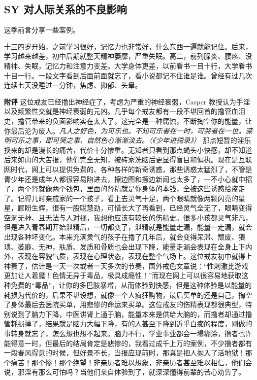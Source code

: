 \subsection{SY 对人际关系的不良影响}

这季前言分享一些案例。

\begin{case}
    十三四岁开始，之前学习很好，记忆力也非常好，什么东西一遍就能记住。后来，学习越来越差，初中后期就整天精神萎靡，严重失眠。高二，前列腺炎、腰疼、没精神、失眠，记忆力和注意力变差。大学身体更差，以前看书一目十行，大学看书十目一行。一段文字看到后面前面就忘了，看小说都记不住谁是谁。曾经有过几次连续七天没睡过一分钟，焦虑、抑郁、头晕。

    \textbf{附评} 这位戒友已经撸出神经症了，考虑为严重的神经衰弱，Casper 教授认为手淫以及频繁性交就是神经衰弱的元凶。几乎每个戒友都有一段不堪回首的撸管血泪史，撸管带来的负面影响实在太大了，这完全是一种腐蚀，不断掏空你的能量，让你最后沦为废人。\textit{凡人之好色，为可乐也。不知可乐者在一时，可哭者在一世。深明可乐之事，即可哭之事，自然色心渐渐淡去。（《少年进德录》）} 那点短暂的淫乐换来的却是漫长的痛苦，代价十分惨重。无知者只看到那点蝇头小快感，却不知道后来如山的大苦报，他们完全无知，被砖家洗脑后更显得盲目和偏执。现在是互联网时代，网上可以提供免费的、各种各样的新奇诱惑，那些诱惑太猛烈了，不管是青少年还是成年人都很容易陷进去，擦边图和擦边新闻也太多了，一不小心就中招了，两个肾就像两个钱包，里面的肾精就是你身体的本钱，全被这些诱惑给盗走了。记得儿时亲戚家的一个孩子，看上去灵气十足，两个眼睛就像两颗闪亮的星星，顾盼生辉，很有一股聪慧劲，可惜长大了再看到，已经灵气全无了，眼睛变得空洞无神、且无法与人对视，我想他应该有较长的伤精史。很多小孩都灵气非凡，但是进入青春期开始泄精后，一切都变了，泄精就是能量走漏，能量一走漏，就会出现各种坏变化。本来充满灵气的孩子在撸了几年后，就会变得呆滞、颓废、猥琐、萎靡、无神，肤质、发质和骨质也会出现下降，能量走漏会表现在全身上下内外，表现在容貌气质，表现在心理状态，表现在整个气场上。这位戒友初中就得上神衰了，估计是一天一次或者一天多次的节奏，国外戒色文章说：“性刺激比游戏更加让人着魔！色情无异于毒品，极具成瘾性！”而现在网上可以很容易地获取这种免费的“毒品”，让你的多巴胺暴增，从而体验到快感，但是这种体验是以能量的耗损为代价的，后果不堪设想，就像一个人疯狂购物，最后买单的还是自己，掏空了身体最后去医院买单，用悲惨的命运来买单。这位戒友的伤精表现都很典型，特别说到了脑力下降，中医讲肾上通于脑，能量本来是供给大脑的，而撸者却通过撸管耗损掉了，结果就是脑力大幅下降，有的人甚至下降到近乎白痴的程度，刚做的事转身就忘了，怎么想也想不起来。脑力不行，学业事业都会一塌糊涂，撸者也许能得意一时，但最后的结局肯定是悲惨的，我看过成千上万的案例，不少撸者都有一段春风得意的时候，但好景不长，当报应现前时，那真是把人抛入了活地狱！那个痛苦！那个惨！那个绝望！非亲历者难以想象，非亲历者甚至难以相信，他们会说，邪淫有那么可怕吗？当他们亲自体验到了，就深深懂得前辈的苦心劝告了。
\end{case}

